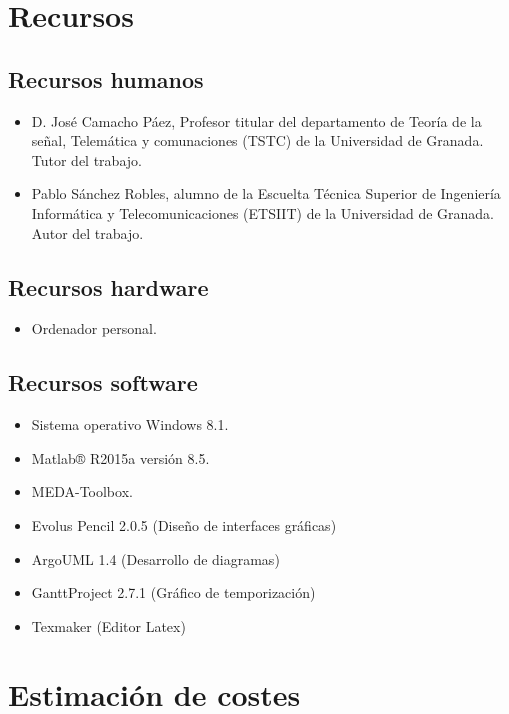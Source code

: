 \section{Recursos}
\subsection{Recursos humanos}

\begin{itemize}
\item D. José Camacho Páez, Profesor titular del departamento de Teoría de la señal, Telemática y comunaciones (TSTC) de la Universidad de Granada. Tutor del trabajo.
\item	Pablo Sánchez Robles, alumno de la Escuelta Técnica Superior de Ingeniería Informática y Telecomunicaciones (ETSIIT) de la Universidad de Granada. Autor del trabajo.
\end{itemize}
\bigskip
\subsection{Recursos hardware}
\begin{itemize}
\item Ordenador personal.
\end{itemize}

\bigskip

\subsection{Recursos software}

\begin{itemize}
\item Sistema operativo Windows 8.1.
\item Matlab® R2015a versión 8.5.
\item MEDA-Toolbox.
\item Evolus Pencil 2.0.5 (Diseño de interfaces gráficas)
\item ArgoUML 1.4	(Desarrollo de diagramas)
\item GanttProject 2.7.1	(Gráfico de temporización)
\item Texmaker	(Editor Latex)
\end{itemize}

\section{Estimación de costes}

